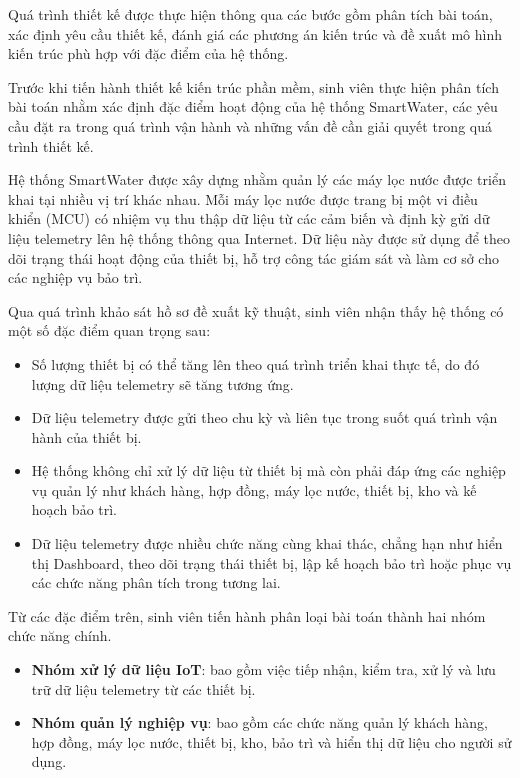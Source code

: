 Quá trình thiết kế được thực hiện thông qua các bước gồm phân tích bài toán, xác định yêu cầu thiết kế, đánh giá các phương án kiến trúc và đề xuất mô hình kiến trúc phù hợp với đặc điểm của hệ thống.


Trước khi tiến hành thiết kế kiến trúc phần mềm, sinh viên thực hiện phân tích bài toán nhằm xác định đặc điểm hoạt động của hệ thống SmartWater, các yêu cầu đặt ra trong quá trình vận hành và những vấn đề cần giải quyết trong quá trình thiết kế.

Hệ thống SmartWater được xây dựng nhằm quản lý các máy lọc nước được triển khai tại nhiều vị trí khác nhau. Mỗi máy lọc nước được trang bị một vi điều khiển (MCU) có nhiệm vụ thu thập dữ liệu từ các cảm biến và định kỳ gửi dữ liệu telemetry lên hệ thống thông qua Internet. Dữ liệu này được sử dụng để theo dõi trạng thái hoạt động của thiết bị, hỗ trợ công tác giám sát và làm cơ sở cho các nghiệp vụ bảo trì.

Qua quá trình khảo sát hồ sơ đề xuất kỹ thuật, sinh viên nhận thấy hệ thống có một số đặc điểm quan trọng sau:

\begin{itemize}
    \item Số lượng thiết bị có thể tăng lên theo quá trình triển khai thực tế, do đó lượng dữ liệu telemetry sẽ tăng tương ứng.

    \item Dữ liệu telemetry được gửi theo chu kỳ và liên tục trong suốt quá trình vận hành của thiết bị.

    \item Hệ thống không chỉ xử lý dữ liệu từ thiết bị mà còn phải đáp ứng các nghiệp vụ quản lý như khách hàng, hợp đồng, máy lọc nước, thiết bị, kho và kế hoạch bảo trì.

    \item Dữ liệu telemetry được nhiều chức năng cùng khai thác, chẳng hạn như hiển thị Dashboard, theo dõi trạng thái thiết bị, lập kế hoạch bảo trì hoặc phục vụ các chức năng phân tích trong tương lai.
\end{itemize}

Từ các đặc điểm trên, sinh viên tiến hành phân loại bài toán thành hai nhóm chức năng chính.

\begin{itemize}
    \item \textbf{Nhóm xử lý dữ liệu IoT}: bao gồm việc tiếp nhận, kiểm tra, xử lý và lưu trữ dữ liệu telemetry từ các thiết bị.

    \item \textbf{Nhóm quản lý nghiệp vụ}: bao gồm các chức năng quản lý khách hàng, hợp đồng, máy lọc nước, thiết bị, kho, bảo trì và hiển thị dữ liệu cho người sử dụng.
\end{itemize}


